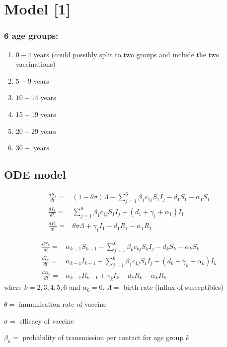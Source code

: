 \documentclass[a4paper, 12pt]{article}
\begin{document}
\section*{Model [1]}

\subsubsection*{6 age groups:}
\begin{enumerate}
\item $0-4$ years (could possibly split to two groups and include the two
vaccinations)
\item $5-9$ years
\item $10-14$ years
\item $15-19$ years
\item $20-29$ years
\item $30+$ years
\end{enumerate}

\subsection*{ODE model}

\begin{align*}
\frac{dS_{1}}{dt}= & (1-\theta\sigma)\Lambda-\sum_{j=1}^{6}\beta_{1}c_{1j}S_{1}I_{j}-d_{1}S_{1}-\alpha_{1}S_{1}\\
\frac{dI_{1}}{dt}= & \sum_{j=1}^{6}\beta_{1}c_{1j}S_{1}I_{j}-(d_{1}+\gamma_{1}+\alpha_{1})I_{1}\\
\frac{dR_{1}}{dt}= & \theta\sigma\Lambda+\gamma_{1}I_{1}-d_{1}R_{1}-\alpha_{1}R_{1}
\end{align*}

\begin{align*}
\frac{dS_{k}}{dt}= & \alpha_{k-1}S_{k-1}-\sum_{j=1}^{6}\beta_{k}c_{kj}S_{k}I_{j}-d_{k}S_{k}-\alpha_{k}S_{k}\\
\frac{dI_{k}}{dt}= & \alpha_{k-1}I_{k-1}+\sum_{j=1}^{6}\beta_{1}c_{1j}S_{1}I_{j}-(d_{k}+\gamma_{k}+\alpha_{k})I_{k}\\
\frac{dR_{k}}{dt}= & \alpha_{k-1}R_{k-1}+\gamma_{k}I_{k}-d_{k}R_{k}-\alpha_{k}R_{k}
\end{align*}
where $k=2,3,4,5,6$ and $\alpha_{6}=0$.
$\Lambda=$ birth rate (influx of susceptibles)

$\theta=$ immunisation rate of vaccine

$\sigma=$ efficacy of vaccine

$\beta_{k}=$ probability of transmission per contact for age group
$k$
\end{document}
